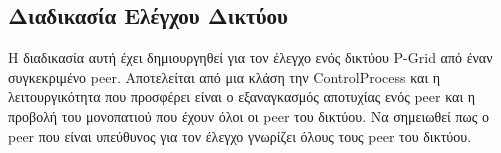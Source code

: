 \subsection{Διαδικασία Ελέγχου Δικτύου}

Η διαδικασία αυτή έχει δημιουργηθεί για τον έλεγχο ενός δικτύου 
P-Grid από έναν συγκεκριμένο peer. Αποτελείται από μια κλάση την 
ControlProcess και η λειτουργικότητα που προσφέρει είναι ο εξαναγκασμός 
αποτυχίας ενός peer και η προβολή του μονοπατιού που έχουν όλοι οι peer 
του δικτύου. Να σημειωθεί πως ο peer που είναι υπεύθυνος για τον έλεγχο 
γνωρίζει όλους τους peer του δικτύου.
